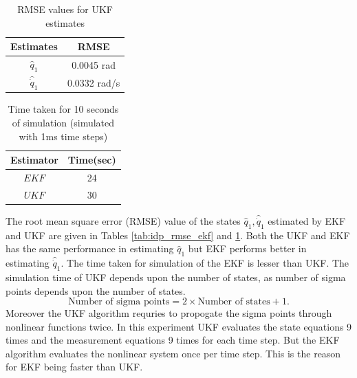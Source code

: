 \begin{table}[H]
    \centering
    \begin{tabular}{|c|c|}
    \hline
    Estimates &RMSE \\ \hline
    $\hat q_1$   &0.0045 rad \\ \hline
    $\hat {\dot q}_1$ & 0.0332 rad/s\\ \hline
    \end{tabular}
    \caption{RMSE values for UKF estimates}
    \label{tab:idp_rmse_ukf}
\end{table}

\begin{table}[H]
    \centering
    \begin{tabular}{|c|c|}
    \hline
    Estimator &Time(sec) \\ \hline
    $EKF$ &24 \\ \hline
    $UKF$ &30 \\ \hline
    \end{tabular}
    \caption{Time taken for 10 seconds of simulation (simulated with 1ms time steps)}
    \label{tab:idp_sim_time}
\end{table}
The root mean square error (RMSE) value of the states $\hat q_1, \hat{\dot q}_1 $ estimated by EKF and UKF are given in Tables \ref{tab:idp_rmse_ekf} and \ref{tab:idp_rmse_ukf}. Both the UKF and EKF has the same performance in estimating $\hat q_1$ but EKF performs better in estimating $\hat{\dot q}_1$. The time taken for simulation of the EKF is lesser than UKF. The simulation time of UKF depends upon the number of states, as number of sigma points depends upon the number of states. $$\text{Number of sigma points}=2\times \text{Number of states} +1.$$  Moreover the UKF algorithm requries to propogate the sigma points through nonlinear functions twice. In this experiment UKF evaluates the state equations 9 times and the measurement equations 9 times for each time step. But the EKF algorithm evaluates the nonlinear system once per time step. This is the reason for EKF being faster than UKF. 
